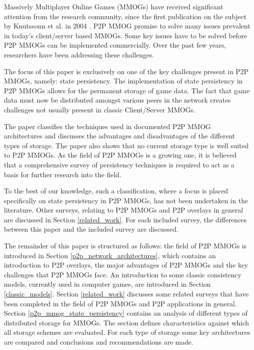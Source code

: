 \documentclass[10pt,a4paper,journal,cspaper,compsoc]{IEEEtran}
\begin{document}
%
%
%
%

 Massively Multiplayer Online Games (MMOGs) have received significant attention from the research community, since
the first publication on the subject by Knutssonn et al. in 2004 \cite{knutsson_p2p_first}. P2P MMOG promise to solve many issues prevalent in
today's client/server based MMOGs. Some key issues have to be solved before P2P MMOGs can be implemented commercially. Over the past few years,
researchers have been addressing these challenges.

The focus of this paper is exclusively on one of the key challenges present in P2P MMOGs, namely: state persistency. The implementation of state
persistency in P2P MMOGs allows for the permanent storage of game data. The fact that game data must now be distributed amongst various peers in the
network creates challenges not usually present in classic Client/Server MMOGs.

The paper classifies the techniques used in documented P2P MMOG architectures and discusses the advantages and disadvantages of the different types
of storage. The paper also shows that no current storage type is well suited to P2P MMOGs. As the field of P2P MMOGs is a growing one, it is believed
that a comprehensive survey of persistency techniques is required to act as a basis for further research into the field.

To the best of our knowledge, such a classification, where a focus is placed specifically on state persistency in P2P MMOGs, has not been undertaken
in the literature. Other surveys, relating to P2P MMOGs and P2P overlays in general are discussed in Section \ref{related_work}. For each included
survey, the differences between this paper and the included survey are discussed.

The remainder of this paper is structured as follows: the field of P2P MMOGs is introduced in Section \ref{p2p_network_architectures}, which contains
an introduction to P2P overlays, the major advantages of P2P MMOGs and the key challenges that P2P MMOGs face. An introduction to some classic
consistency models, currently used in computer games, are introduced in Section \ref{classic_models}. Section \ref{related_work} discusses some
related surveys that have been completed in the field of P2P MMOGs and P2P applications in general. Section \ref{p2p_mmog_state_persistency} contains
an analysis of different types of distributed storage for MMOGs. The section defines characteristics against which all storage schemes are evaluated.
For each type of storage some key architectures are compared and conclusions and recommendations are made.
\end{document}
